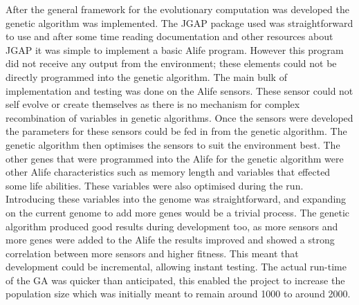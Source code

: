 \documentclass[12pt]{article}
\begin{document}
After the general framework for the evolutionary computation was developed the genetic algorithm was implemented. The JGAP package used
was straightforward to use and after some time reading documentation and other resources about JGAP it was simple to implement a basic
Alife program. However this program did not receive any output from the environment; these elements could not be directly programmed into
the genetic algorithm. The main bulk of implementation and testing was done on the Alife sensors. These sensor could not self evolve or 
create themselves as there is no mechanism for complex recombination of variables in genetic algorithms. Once the sensors were developed
the parameters for these sensors could be fed in from the genetic algorithm. The genetic algorithm then optimises the sensors to suit
the environment best. The other genes that were programmed into the Alife for the genetic algorithm were other Alife characteristics
such as memory length and variables that effected some life abilities. These variables were also optimised during the run. Introducing
these variables into the genome was straightforward, and expanding on the current genome to add more genes would be a trivial process.
The genetic algorithm produced good results during development too, as more sensors and more genes were added to the Alife the results
improved and showed a strong correlation between more sensors and higher fitness. This meant that development could be incremental, allowing
instant testing. The actual run-time of the GA was quicker than anticipated, this enabled the project to increase the population size which
was initially meant to remain around 1000 to around 2000.
\end{document}

